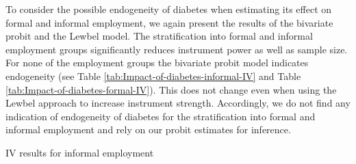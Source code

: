 \clearpage

To consider the possible endogeneity of diabetes when estimating its
effect on formal and informal employment, we again present the results
of the bivariate probit and the Lewbel model. The stratification into
formal and informal employment groups significantly reduces instrument
power as well as sample size. For none of the employment groups the
bivariate probit model indicates endogeneity (see Table \ref{tab:Impact-of-diabetes-informal-IV}
and Table \ref{tab:Impact-of-diabetes-formal-IV}). This does not
change even when using the Lewbel approach to increase instrument
strength. Accordingly, we do not find any indication of endogeneity
of diabetes for the stratification into formal and informal employment
and rely on our probit estimates for inference.

\begin{table}[ph]
\protect\caption{\label{tab:Impact-of-diabetes-informal-IV}IV results for informal
employment}


\begin{center}
\resizebox{\textwidth}{!}{%

}
\end{center}
\end{table}
